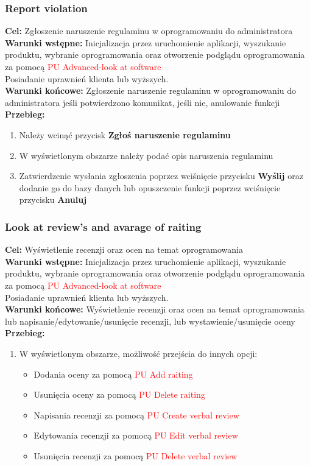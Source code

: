 \documentclass[12pt,a4paper]{article}
\begin{document}
\subsubsection{Report violation}
\textbf{Cel: } Zgłoszenie naruszenie regulaminu w oprogramowaniu do administratora \\
\textbf{Warunki wstępne:} Inicjalizacja przez uruchomienie aplikacji,  wyszukanie produktu, wybranie oprogramowania oraz otworzenie podglądu oprogramowania za pomocą \textcolor{red}{PU Advanced-look at software}\\ Posiadanie uprawnień klienta lub wyższych.\\
\textbf{Warunki końcowe:} Zgłoszenie naruszenie regulaminu w oprogramowaniu do administratora jeśli potwierdzono komunikat, jeśli nie, anulowanie funkcji\\
\textbf{Przebieg:}
\begin{enumerate}
    \item Należy wcinąć przycisk \textbf{Zgłoś naruszenie regulaminu}
    \item W wyświetlonym obszarze należy podać opis naruszenia regulaminu
    \item Zatwierdzenie wysłania zgłoszenia poprzez wciśnięcie przycisku \textbf{Wyślij} oraz dodanie go do bazy danych lub opuszczenie funkcji poprzez wciśnięcie przycisku \textbf{Anuluj}
\end{enumerate}

\subsubsection{Look at review's and avarage of raiting}
\textbf{Cel: } Wyświetlenie recenzji oraz ocen na temat oprogramowania \\
\textbf{Warunki wstępne:} Inicjalizacja przez uruchomienie aplikacji,  wyszukanie produktu, wybranie oprogramowania oraz otworzenie podglądu oprogramowania za pomocą \textcolor{red}{PU Advanced-look at software}\\ Posiadanie uprawnień klienta lub wyższych.\\
\textbf{Warunki końcowe:} Wyświetlenie recenzji oraz ocen na temat oprogramowania lub napisanie/edytowanie/usunięcie recenzji, lub wystawienie/usunięcie oceny \\
\textbf{Przebieg:}
\begin{enumerate}
    \item W wyświetlonym obszarze, możliwość przejścia do innych opcji:
    \begin{itemize}
        \item Dodania oceny za pomocą \textcolor{red}{PU Add raiting}
        \item Usunięcia oceny za pomocą \textcolor{red}{PU Delete raiting}
        \item Napisania recenzji za pomocą \textcolor{red}{PU Create verbal review}
        \item Edytowania recenzji za pomocą \textcolor{red}{PU Edit verbal review}
        \item Usunięcia recenzji za pomocą \textcolor{red}{PU Delete verbal review}
    \end{itemize}
\end{enumerate}
\end{document}
